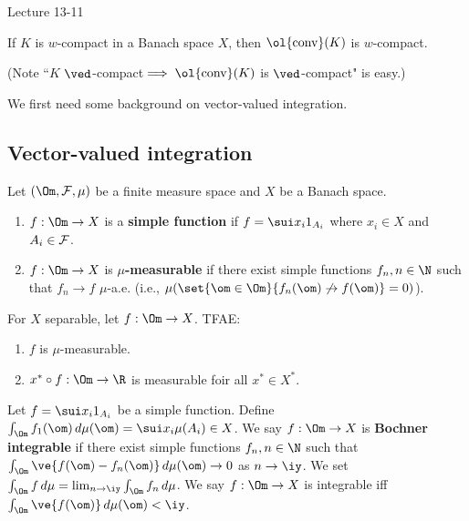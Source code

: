 Lecture 13-11

\begin{thm}
If $K$ is $w$-compact in a Banach space $X$, then $\ol{\text{conv}}(K)$ is $w$-compact. 
\end{thm}

(Note ``$K$ $\ved$-compact$\implies\ol{\text{conv}}(K)$ is $\ved$-compact" is easy.)

We first need some background on vector-valued integration.
\subsection{Vector-valued integration}
\begin{df}
Let $(\Om,\cal F,\mu)$ be a finite measure space and $X$ be a Banach space.
\begin{enumerate}
\item
$f:\Om\to X$ is a \textbf{simple function} if $f=\sui x_i1_{A_i}$ where $x_i\in X$ and $A_i\in \cal F$.
\item
$f:\Om\to X$ is \textbf{$\mu$-measurable} if there exist simple functions $f_n,n\in \N$ such that $f_n\to f$ $\mu$-a.e. (i.e., $\mu(\set{\om\in \Om}{f_n(\om)\not\to f(\om)}=0)$). 
\end{enumerate}
\end{df}

\begin{thm}
For $X$ separable, let $f:\Om\to X$. TFAE:
\begin{enumerate}
\item
$f$ is $\mu$-measurable. 
\item
$x^*\circ f:\Om\to \R$ is measurable foir all $x^*\in X^*$. 
\end{enumerate}
\end{thm}

\begin{df}
Let $f=\sui x_i1_{A_i}$ be a simple function. Define $\int_{\Om} f_1(\om) \,d\mu(\om)=\sui x_i\mu(A_i)\in X$. We say $f:\Om\to X$ is \textbf{Bochner integrable} if there exist simple functions $f_n,n\in \N$ such that $\int_{\Om}\ve{f(\om)-f_n(\om)}\,d\mu(\om)\to 0$ as $n\to \iy$. We set $\int_{\Om} f\,d\mu=\lim_{n\to \iy} \int_{\Om}f_n\,d\mu$. We say $f:\Om\to X$ is integrable iff $\int_{\Om}\ve{f(\om)}\,d\mu(\om)<\iy$.
\end{df}


